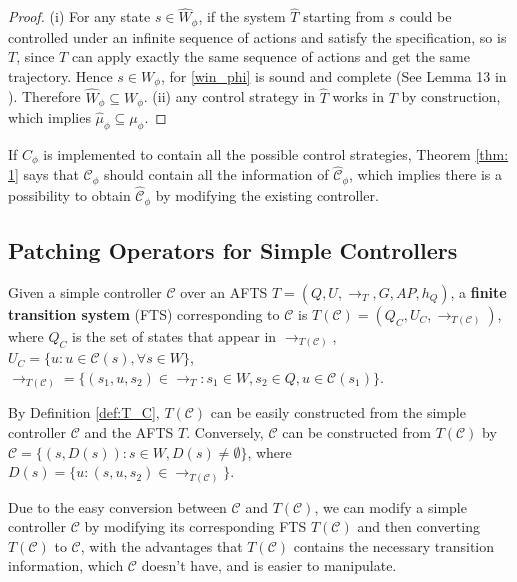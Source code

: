 \begin{proof}
	(i) For any state $ s\in \widehat{W}_{\phi} $, if the system $ \widehat{T} $ starting from $ s $ could be controlled under an infinite sequence of actions and satisfy the specification, so is $ T $, since $ T $ can apply exactly the same sequence of actions and get the same trajectory. Hence $ s\in W_{\phi} $, for \eqref{win_phi} is sound and complete (See Lemma 13 in \cite{Nilsson2017}). Therefore $ \widehat{W}_{\phi}\subseteq W_{\phi} $. (ii) any control strategy in $ \widehat{T} $ works in $ T $ by construction, which implies $ \widehat{\mu}_{\phi} \subseteq \mu_{\phi}$.
\end{proof}

If $ C_{\phi} $ is implemented to contain all the possible control strategies, Theorem \ref{thm: 1} says that $ \mathcal{C}_{\phi} $ should contain all the information of $ \widehat{\mathcal{C}}_{\phi} $, which implies there is a possibility to obtain $ \widehat{\mathcal{C}}_{\phi} $ by modifying the existing controller.



\subsection{Patching Operators for Simple Controllers}
\label{sec:patching_simple}
\begin{definition}
	Given a simple controller $ \mathcal{C} $ over an AFTS $T = (Q,U,\rightarrow_T, G,AP,h_Q) $, a \textbf{finite transition system} (FTS) corresponding to $ \mathcal{C} $ is $T(\mathcal{C}) = (Q_C, U_C, \rightarrow_{T(\mathcal{C})})$, where $ Q_C $ is the set of states that appear in $ \rightarrow_{T(\mathcal{C})} $, $ U_C=\{u: u\in \mathcal{C}(s), \forall s\in W\} $, $ \rightarrow_{T(\mathcal{C})} =\{(s_1,u,s_2)\in \rightarrow_T: s_1\in W,s_2\in Q, u\in \mathcal{C}(s_1)\} $. \label{def:T_C}
\end{definition}

\begin{remark}
	By Definition \ref{def:T_C}, $ T(\mathcal{C}) $ can be easily constructed from the simple controller $ \mathcal{C} $ and the AFTS $ T $. Conversely, $ \mathcal{C} $ can be constructed from $ T(\mathcal{C}) $ by $ \mathcal{C} = \{(s,D(s)):s\in W,D(s)\not=\emptyset\} $, where $ D(s)=\{u:(s,u,s_2)\in \rightarrow_{T(\mathcal{C})}\} $.
\end{remark}
Due to the easy conversion between  $ \mathcal{C} $ and $ T(\mathcal{C}) $, we can modify a simple controller $ \mathcal{C} $ by modifying its corresponding FTS $ T(\mathcal{C}) $ and then converting $ T(\mathcal{C}) $ to $ \mathcal{C} $, with the advantages that $ T(\mathcal{C}) $ contains the necessary transition information, which $ \mathcal{C} $ doesn't have, and is easier to manipulate. 

